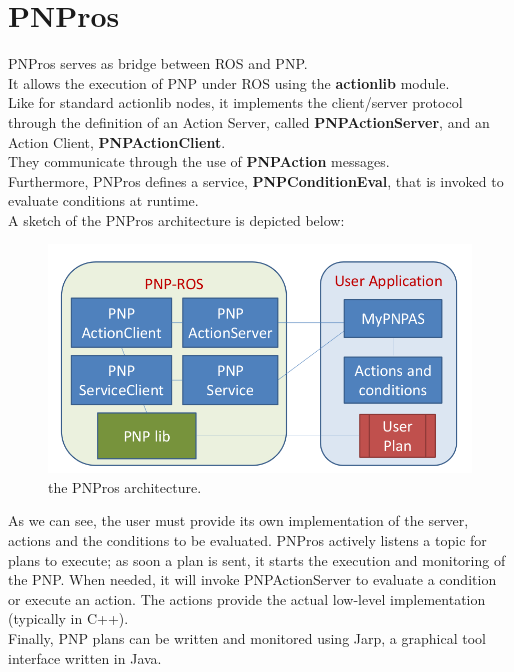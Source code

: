 \documentclass[pdftex,12pt,a4paper]{report}
\begin{document}
\section{PNPros}
PNPros serves as bridge between ROS and PNP.\\
It allows the execution of PNP under ROS using the \textbf{actionlib} module.\\ 
Like for standard actionlib nodes, it implements the client/server protocol through the definition of an Action Server, called \textbf{PNPActionServer}, and an Action Client, \textbf{PNPActionClient}.\\ 
They communicate through the use of \textbf{PNPAction} messages.\\ 
Furthermore, PNPros defines a service, \textbf{PNPConditionEval}, that is invoked to evaluate conditions at runtime.\\
A sketch of the PNPros architecture is depicted below:
\begin{figure}[H]
	\centering
	\includegraphics[scale=0.4]{images/pnpros.png}
	\caption{the PNPros architecture.}
\end{figure}
\noindent As we can see, the user must provide its own implementation of the server, actions and the conditions to be evaluated. 
PNPros actively listens a topic for plans to execute; as soon a plan is sent, it starts the execution and monitoring of the PNP. When needed, it will invoke PNPActionServer to evaluate a condition or execute an action. The actions provide the actual low-level implementation (typically in C++).\\
Finally, PNP plans can be written and monitored using Jarp, a graphical tool interface written in Java.
\end{document}
